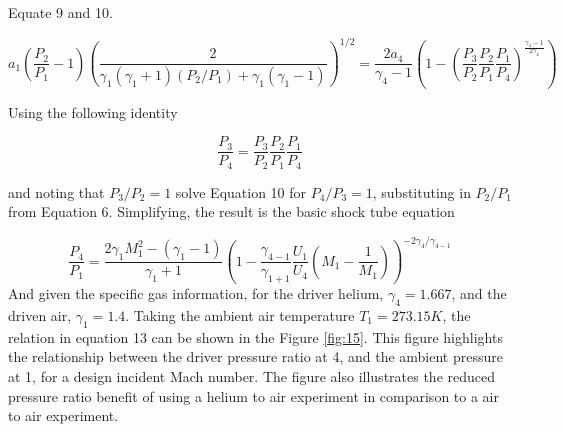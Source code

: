 Equate 9 and 10.

\begin{equation}
a_1\left(\frac{P_2}{P_1} - 1\right)\left(\frac{2}{\gamma_1(\gamma_1 + 1)(P_2/P_1) + \gamma_1(\gamma_1 - 1)}\right)^{1/2} = \frac{2a_4}{\gamma_4 - 1}\left(1 - \left(\frac{P_3}{P_2}\frac{P_2}{P_1}\frac{P_1}{P_4}\right)^{\frac{\gamma_4 - 1}{2\gamma_4}}\right)
\end{equation}

Using the following identity

\begin{equation}
\frac{P_3}{P_4}=\frac{P_3}{P_2}\frac{P_2}{P_1}\frac{P_1}{P_4}
\end{equation}

and noting that $P_3/P_2 = 1$ solve Equation 10 for $P_4/P_3 = 1$, substituting in $P_2/P_1$ from Equation 6. Simplifying, the result is the basic shock tube equation

\begin{equation}
\frac{P_4}{P_1} = \frac{2\gamma_1M_1^2 - (\gamma_1 - 1)}{\gamma_1 + 1}\left(1 - \frac{\gamma_{4-1}}{\gamma_{1+1}}\frac{U_1}{U_4}\left(M_1 - \frac{1}{M_1}\right)\right)^{-2\gamma_4/\gamma_{4-1}}
\end{equation}
And given the specific gas information, for the driver helium, $\gamma_4 = 1.667$, and the driven air, $\gamma_1 = 1.4$. Taking the ambient air temperature $T_1 = 273.15K$, the relation in equation 13 can be shown in the Figure \ref{fig:15}. This figure highlights the relationship between the driver pressure ratio at 4, and the ambient pressure at 1, for a design incident Mach number. The figure also illustrates the reduced pressure ratio benefit of using a helium to air experiment in comparison to a air to air experiment. 
	


